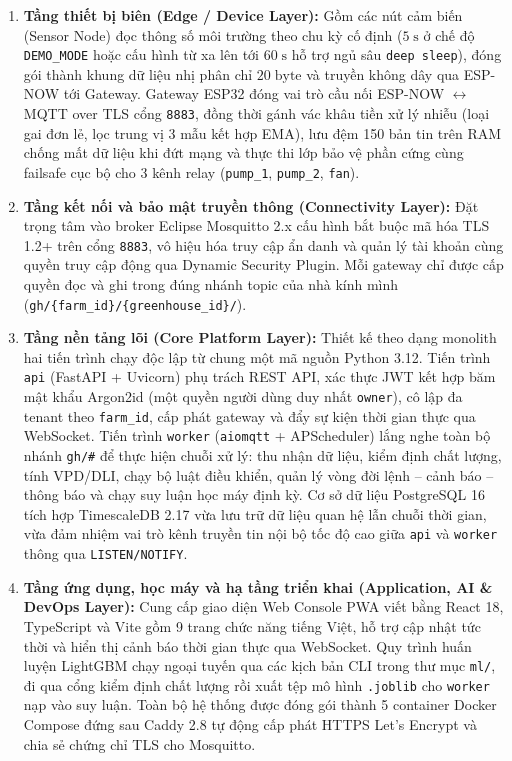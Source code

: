 \begin{enumerate}[leftmargin=*]
    \item \textbf{Tầng thiết bị biên (Edge / Device Layer):} Gồm các nút cảm biến (Sensor Node) đọc thông số môi trường theo chu kỳ cố định (\(5\;\text{s}\) ở chế độ \texttt{DEMO\_MODE} hoặc cấu hình từ xa lên tới \(60\;\text{s}\) hỗ trợ ngủ sâu \texttt{deep sleep}), đóng gói thành khung dữ liệu nhị phân chỉ \(20\;\text{byte}\) và truyền không dây qua ESP-NOW tới Gateway. Gateway ESP32 đóng vai trò cầu nối ESP-NOW \(\leftrightarrow\) MQTT over TLS cổng \texttt{8883}, đồng thời gánh vác khâu tiền xử lý nhiễu (loại gai đơn lẻ, lọc trung vị 3 mẫu kết hợp EMA), lưu đệm 150 bản tin trên RAM chống mất dữ liệu khi đứt mạng và thực thi lớp bảo vệ phần cứng cùng failsafe cục bộ cho 3 kênh relay (\texttt{pump\_1}, \texttt{pump\_2}, \texttt{fan}).
    \item \textbf{Tầng kết nối và bảo mật truyền thông (Connectivity Layer):} Đặt trọng tâm vào broker Eclipse Mosquitto 2.x cấu hình bắt buộc mã hóa TLS 1.2+ trên cổng \texttt{8883}, vô hiệu hóa truy cập ẩn danh và quản lý tài khoản cùng quyền truy cập động qua Dynamic Security Plugin. Mỗi gateway chỉ được cấp quyền đọc và ghi trong đúng nhánh topic của nhà kính mình (\texttt{gh/\{farm\_id\}/\{greenhouse\_id\}/}).
    \item \textbf{Tầng nền tảng lõi (Core Platform Layer):} Thiết kế theo dạng monolith hai tiến trình chạy độc lập từ chung một mã nguồn Python 3.12. Tiến trình \texttt{api} (FastAPI + Uvicorn) phụ trách REST API, xác thực JWT kết hợp băm mật khẩu Argon2id (một quyền người dùng duy nhất \texttt{owner}), cô lập đa tenant theo \texttt{farm\_id}, cấp phát gateway và đẩy sự kiện thời gian thực qua WebSocket. Tiến trình \texttt{worker} (\texttt{aiomqtt} + APScheduler) lắng nghe toàn bộ nhánh \texttt{gh/\#} để thực hiện chuỗi xử lý: thu nhận dữ liệu, kiểm định chất lượng, tính VPD/DLI, chạy bộ luật điều khiển, quản lý vòng đời lệnh -- cảnh báo -- thông báo và chạy suy luận học máy định kỳ. Cơ sở dữ liệu PostgreSQL 16 tích hợp TimescaleDB 2.17 vừa lưu trữ dữ liệu quan hệ lẫn chuỗi thời gian, vừa đảm nhiệm vai trò kênh truyền tin nội bộ tốc độ cao giữa \texttt{api} và \texttt{worker} thông qua \texttt{LISTEN/NOTIFY}.
    \item \textbf{Tầng ứng dụng, học máy và hạ tầng triển khai (Application, AI \& DevOps Layer):} Cung cấp giao diện Web Console PWA viết bằng React 18, TypeScript và Vite gồm 9 trang chức năng tiếng Việt, hỗ trợ cập nhật tức thời và hiển thị cảnh báo thời gian thực qua WebSocket. Quy trình huấn luyện LightGBM chạy ngoại tuyến qua các kịch bản CLI trong thư mục \texttt{ml/}, đi qua cổng kiểm định chất lượng rồi xuất tệp mô hình \texttt{.joblib} cho \texttt{worker} nạp vào suy luận. Toàn bộ hệ thống được đóng gói thành 5 container Docker Compose đứng sau Caddy 2.8 tự động cấp phát HTTPS Let's Encrypt và chia sẻ chứng chỉ TLS cho Mosquitto.
\end{enumerate}

